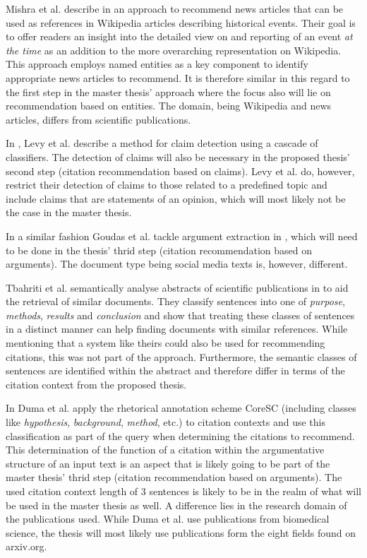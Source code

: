 \documentclass{proseminar}
\begin{document}
Mishra et al. describe in \cite{Mishra2016} an approach to recommend news articles that can be used as references in Wikipedia articles describing historical events. Their goal is to offer readers an insight into the detailed view on and reporting of an event \emph{at the time} as an addition to the more overarching representation on Wikipedia. This approach employs named entities as a key component to identify appropriate news articles to recommend. It is therefore similar in this regard to the first step in the master thesis' approach where the focus also will lie on recommendation based on entities. The domain, being Wikipedia and news articles, differs from scientific publications.

In \cite{Levy2014}, Levy et al. describe a method for claim detection using a cascade of classifiers. The detection of claims will also be necessary in the proposed thesis' second step (citation recommendation based on claims). Levy et al. do, however, restrict their detection of claims to those related to a predefined topic and include claims that are statements of an opinion, which will most likely not be the case in the master thesis.

In a similar fashion Goudas et al. tackle argument extraction in \cite{Goudas2014}, which will need to be done in the thesis' thrid step (citation recommendation based on arguments). The document type being social media texts is, however, different.

Tbahriti et al. semantically analyse abstracts of scientific publications in \cite{Tbahriti2006} to aid the retrieval of similar documents. They classify sentences into one of \emph{purpose}, \emph{methods}, \emph{results} and \emph{conclusion} and show that treating these classes of sentences in a distinct manner can help finding documents with similar references. While mentioning that a system like theirs could also be used for recommending citations, this was not part of the approach. Furthermore, the semantic classes of sentences are identified within the abstract and therefore differ in terms of the citation context from the proposed thesis.

In \cite{Duma2016} Duma et al. apply the rhetorical annotation scheme CoreSC\cite{Liakata2010} (including classes like \emph{hypothesis}, \emph{background}, \emph{me\-thod}, etc.) to citation contexts and use this classification as part of the query when determining the citations to recommend. This determination of the function of a citation within the argumentative structure of an input text is an aspect that is likely going to be part of the master thesis' thrid step (citation recommendation based on arguments). The used citation context length of 3 sentences is likely to be in the realm of what will be used in the master thesis as well. A difference lies in the research domain of the publications used. While Duma et al. use publications from biomedical science, the thesis will most likely use publications form the eight fields found on arxiv.org.
\end{document}
